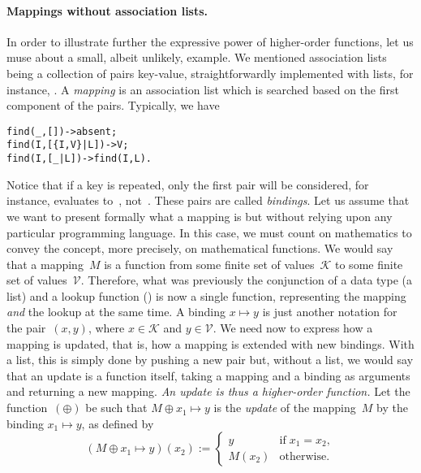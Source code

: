 \paragraph{Mappings without association lists.}

In order to illustrate further the expressive power of
higher\hyp{}order functions, let us muse about a small, albeit
unlikely, example. We mentioned 
association lists being a collection of pairs key\hyp{}value,
straightforwardly implemented with lists, for instance,
\erlcode{[\{a,0\},\{b,1\},\{a,5\}]}. A \emph{mapping} is an
association list which is searched based on the first component of the
pairs. Typically, we have
\begin{alltt}
find(_,       []) -> absent;
find(I,[\{I,V\}|L]) -> V;\hfill% \emph{Associated value found}
find(I,    [_|L]) -> find(I,L).\hfill% \emph{Keep searching}
\end{alltt}
Notice that if a key is repeated, only the first pair will be
considered, for instance, 
evaluates to~, not~. These pairs are called
\emph{bindings}. Let us assume that we want to present formally what a
mapping is but without relying upon any particular programming
language. In this case, we must count on mathematics to convey the
concept, more precisely, on mathematical functions. We would say that
a mapping~\(M\) is a function from some finite set of
values~\(\mathcal{K}\) to some finite set of
values~\(\mathcal{V}\). Therefore, what was previously the conjunction
of a data type (a list) and a lookup function () is
now a single function, representing the mapping \emph{and} the lookup
at the same time. A binding \(x \mapsto y\) is just another notation
for the pair~\((x, y)\), where \(x \in \mathcal{K}\) and \(y \in
\mathcal{V}\). We need now to express how a mapping is updated, that
is, how a mapping is extended with new bindings. With a list, this is
simply done by pushing a new pair but, without a list, we would say
that an update is a function itself, taking a mapping and a binding as
arguments and returning a new mapping. \emph{An update is thus a
  higher\hyp{}order function.}  Let the function~\((\oplus)\) be such
that \(M \mathrel{\oplus} x_1 \mapsto y\) is the \emph{update} of the
mapping~\(M\) by the binding \(x_1 \mapsto y\), as defined by
\begin{equation*}
(M \mathrel{\oplus} x_1 \mapsto y)(x_2) :=
\begin{cases}
  y      & \text{if} \; x_1 = x_2,\\
  M(x_2) & \text{otherwise.}
\end{cases}
\end{equation*}
